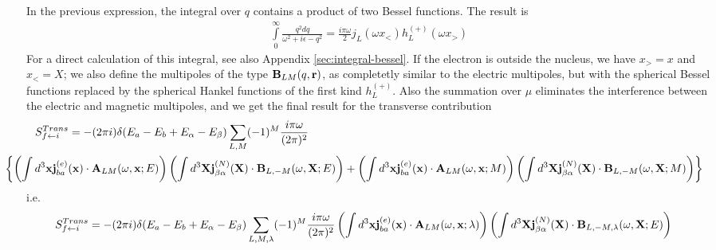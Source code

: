 In the previous expression, the integral over $q$ contains a product of two Bessel functions.  The result is \cite{watson_treatise_nodate}
\begin{align}
    \int\limits_0^{\infty} \frac{q^2 dq}{\omega^2 + i \epsilon - q^2} = \frac{i\pi \omega}{2}j_L(\omega x_<) h_L^{(+)}(\omega x_>)
\end{align}
For a direct calculation of this integral, see also Appendix \ref{sec:integral-bessel}.
If the electron is outside the nucleus, we have $x_> = x$ and $x_< = X$; we also define  the multipoles of the type ${\bf B}_{LM}(q,{\bf r})$, as completetly similar to the electric multipoles, but with the spherical Bessel functions replaced by the spherical Hankel functions of the first kind $h_L^{(+)}$. Also the summation over $\mu$ eliminates the interference between the electric and magnetic multipoles, and we get the final result for the transverse contribution
\begin{align}
     & S_{f\leftarrow i}^{Trans    }  = -(2\pi i)\delta(E_a-E_{b}+E_\alpha-E_{\beta}) \sum\limits_{L,M}(-1)^M \frac{i\pi \omega}{(2\pi)^2} \nonumber                                                                                                                                                                                                                                                                                             \\
     & \hspace*{-1cm}\left\{ \left( \int d^3{\bf x} {\bf j}^{(e)}_{ba}({\bf x})\cdot{\bf A}_{LM}(\omega,{\bf x};E)\right) \left(\int d^3{\bf X}{\bf j}^{(N)}_{\beta\alpha}({\bf X}) \cdot {\bf B}_{L,-M}(\omega,{\bf X};E)\right)+\left( \int d^3{\bf x} {\bf j}^{(e)}_{ba}({\bf x})\cdot{\bf A}_{LM}(\omega,{\bf x};M)\right) \left(\int d^3{\bf X}{\bf j}^{(N)}_{\beta\alpha}({\bf X}) \cdot {\bf B}_{L,-M}(\omega,{\bf X};M)\right)  \right\}
\end{align}
i.e.
\begin{align}
     & S_{f\leftarrow i}^{Trans    }=-(2\pi i)\delta(E_a-E_{b}+E_\alpha-E_{\beta}) \sum\limits_{L,M,\lambda}(-1)^M \frac{i\pi \omega}{(2\pi)^2} \left( \int d^3{\bf x} {\bf j}^{(e)}_{ba}({\bf x})\cdot{\bf A}_{LM}(\omega,{\bf x};\lambda)\right) \left(\int d^3{\bf X}{\bf j}^{(N)}_{\beta\alpha}({\bf X}) \cdot {\bf B}_{L,-M,\lambda}(\omega,{\bf X};E)\right)
\end{align}



